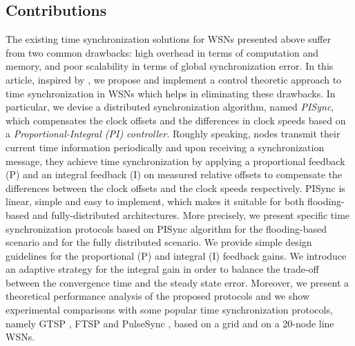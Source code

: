 \documentclass[english,a4paper,10pt,final]{article}
\numberwithin{equation}{section}
\numberwithin{figure}{section}
\begin{document}
 
\subsection{Contributions}

The existing time synchronization solutions for WSNs presented above suffer from two common drawbacks: high overhead in terms of computation and memory, and poor scalability in terms of global synchronization error. In this article, inspired by \cite{Carli_2011}, we propose and implement a control theoretic approach to time synchronization in WSNs which helps in eliminating these drawbacks.
In particular, we devise a distributed synchronization algorithm, named \textit{PISync}, which compensates the clock offsets and the differences in clock speeds based on a \textit{Proportional-Integral (PI) controller}. Roughly speaking,  nodes transmit their current time information periodically and upon receiving a synchronization message, they achieve time synchronization by applying a proportional feedback (P) and an integral feedback (I) on measured relative offsets  to compensate the differences between the clock offsets and the clock speeds respectively. PISync is linear, simple and easy to implement, which makes it suitable for both flooding-based and fully-distributed architectures. More precisely, we present specific time synchronization protocols based on PISync algorithm for the flooding-based scenario and for the fully distributed scenario. We provide simple design guidelines for the proportional (P)  and integral (I) feedback gains. We introduce an adaptive strategy for the integral gain in order to balance the trade-off between the convergence time and the steady state error. Moreover, we present a theoretical performance analysis of the proposed protocols and we show experimental comparisons with some popular time synchronization protocols, namely GTSP  \cite{Sommer2009Gradient}, FTSP \cite{Maroti2004} and PulseSync \cite{Lenzen2009Optimal}, based on a  grid and on a 20-node line WSNs.
\end{document}
